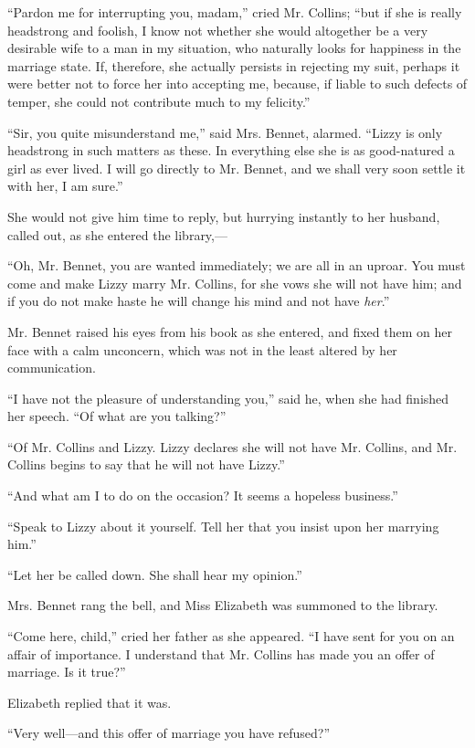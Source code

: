 ``Pardon me for interrupting you, madam,'' cried Mr. Collins; ``but if she is really headstrong and foolish, I know not whether she would altogether be a very desirable wife to a man in my situation, who naturally looks for happiness in the marriage state. If, therefore, she actually persists in rejecting my suit, perhaps it were better not to force her into accepting me, because, if liable to such defects of temper, she could not contribute much to my felicity.''

``Sir, you quite misunderstand me,'' said Mrs. Bennet, alarmed. ``Lizzy is only headstrong in such matters as these. In everything else she is as good-natured a girl as ever lived. I will go directly to Mr. Bennet, and we shall very soon settle it with her, I am sure.''

She would not give him time to reply, but hurrying instantly to her husband, called out, as she entered the library,---

``Oh, Mr. Bennet, you are wanted immediately; we are all in an uproar. You must come and make Lizzy marry Mr. Collins, for she vows she will not have him; and if you do not make haste he will change his mind and not have \textit{her}.''

Mr. Bennet raised his eyes from his book as she entered, and fixed them on her face with a calm unconcern, which was not in the least altered by her communication.

``I have not the pleasure of understanding you,'' said he, when she had finished her speech. ``Of what are you talking?''

``Of Mr. Collins and Lizzy. Lizzy declares she will not have Mr. Collins, and Mr. Collins begins to say that he will not have Lizzy.''

``And what am I to do on the occasion? It seems a hopeless business.''

``Speak to Lizzy about it yourself. Tell her that you insist upon her marrying him.''

``Let her be called down. She shall hear my opinion.''

Mrs. Bennet rang the bell, and Miss Elizabeth was summoned to the library.

``Come here, child,'' cried her father as she appeared. ``I have sent for you on an affair of importance. I understand that Mr. Collins has made you an offer of marriage. Is it true?''

Elizabeth replied that it was.

``Very well---and this offer of marriage you have refused?''

